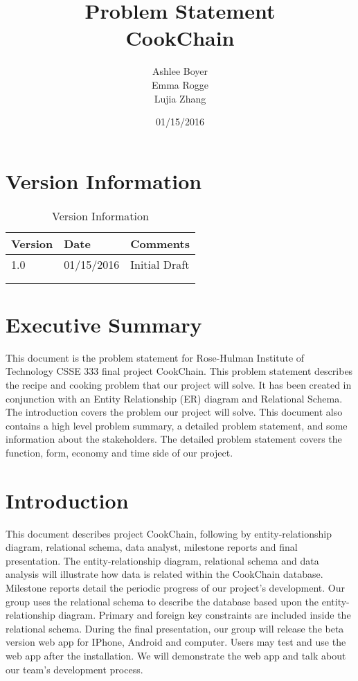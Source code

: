 \documentclass{article}
\title{\textbf{ Problem Statement  \\ CookChain}}
\author{Ashlee Boyer \\Emma Rogge \\ Lujia Zhang}
\date{01/15/2016}
\begin{document}
\maketitle
\renewcommand*\contentsname{Table of Contents} 
\newpage
\tableofcontents
\clearpage
\section{Version Information}
\begin{table}[h]
\centering

\caption*{Version Information}
\label{my-label}
\begin{tabular}{|l|l|l|}
\hline
Version & Date       & Comments      \\ \hline
1.0     & 01/15/2016 & Initial Draft \\ \hline
        &            &               \\ \hline
        &            &               \\ \hline
\end{tabular}
\end{table}
\section{Executive Summary}
This document is the problem statement for Rose-Hulman Institute of Technology CSSE 333 final project CookChain. This problem statement describes the recipe and cooking problem that our project will solve. It has been created in conjunction with an Entity Relationship (ER) diagram and Relational Schema. The introduction covers the problem our project will solve. This document also contains a high level problem summary, a detailed problem statement, and some information about the stakeholders. The detailed problem statement covers the function, form, economy and time side of our project.
\section{Introduction}
This document describes project CookChain, following by entity-relationship diagram, relational schema, data analyst, milestone reports and final presentation. The entity-relationship diagram, relational schema and data analysis will illustrate how data is related within the CookChain database. Milestone reports detail the periodic progress of our project's development.
\newline
\newline
Our group uses the relational schema to describe the database based upon the entity-relationship diagram. Primary and foreign key constraints are included inside the relational schema.
\newline
\newline
During the final presentation, our group will release the beta version web app for IPhone, Android and computer. Users may test and use the web app after the installation. We will demonstrate the web app and talk about our team's development process.
\end{document}
